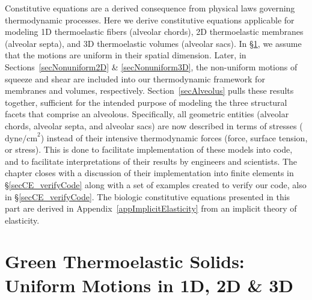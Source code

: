 Constitutive equations are a derived consequence from physical laws governing thermo\-dynamic processes.  Here we derive constitutive equations applicable for modeling 1D thermo\-elastic fibers (alveolar chords), 2D thermo\-elastic membranes (alveolar septa), and 3D thermo\-elastic volumes (alveolar sacs).  In \S\ref{secUniformCE}, we assume that the motions are uniform in their spatial dimension.  Later, in Sections~\ref{secNonuniform2D} \& \ref{secNonuniform3D}, the non-uniform motions of squeeze and shear are included into our thermo\-dynamic framework for membranes and volumes, respectively.  Section~\ref{secAlveolus} pulls these results together, sufficient for the intended purpose of modeling the three structural facets that comprise an alveolous.  Specifically, all geometric entities (alveolar chords, alveolar septa, and alveolar sacs) are now described in terms of stresses ($\text{dyne/cm}^2$) instead of their intensive thermo\-dynamic forces (force, surface tension, or stress).  This is done to facilitate implementation of these models into code, and to facilitate interpretations of their results by engineers and scientists.  The chapter closes with a discussion of their implementation into finite elements in \S\ref{secCE_verifyCode} along with a set of examples created to verify our code, also in \S\ref{secCE_verifyCode}.  The biologic constitutive equations presented in this part are derived in Appendix~\ref{appImplicitElasticity} from an implicit theory of elasticity.

\section{Green Thermoelastic Solids: Uniform Motions in 1D, 2D \& 3D}
\label{secUniformCE}

